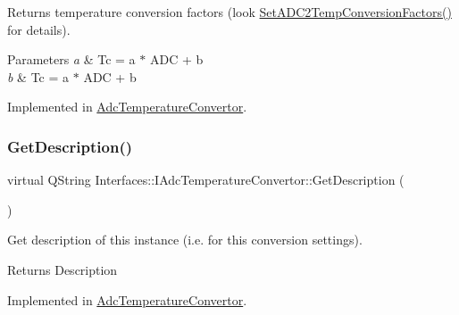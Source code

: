 Returns temperature conversion factors (look \hyperlink{class_interfaces_1_1_i_adc_temperature_convertor_a3e4c9204b3593bc434a041c7a69c430f}{Set\+A\+D\+C2\+Temp\+Conversion\+Factors()} for details). 


\begin{DoxyParams}{Parameters}
{\em a} & Tc = a $\ast$ A\+DC + b \\
\hline
{\em b} & Tc = a $\ast$ A\+DC + b \\
\hline
\end{DoxyParams}


Implemented in \hyperlink{class_adc_temperature_convertor_aeab56811467e8019731f1e2867a76671}{Adc\+Temperature\+Convertor}.

\mbox{\label{class_interfaces_1_1_i_adc_temperature_convertor_a2f3b59be793c3ed43e880ef12e9749bc}} 
\subsubsection{\texorpdfstring{Get\+Description()}{GetDescription()}}
{\footnotesize\ttfamily virtual Q\+String Interfaces\+::\+I\+Adc\+Temperature\+Convertor\+::\+Get\+Description (\begin{DoxyParamCaption}{ }\end{DoxyParamCaption})\hspace{0.3cm}{\ttfamily [pure virtual]}}



Get description of this instance (i.\+e. for this conversion settings). 

\begin{DoxyReturn}{Returns}
Description 
\end{DoxyReturn}


Implemented in \hyperlink{class_adc_temperature_convertor_ad82afdddbac46a95b6da44e769180d10}{Adc\+Temperature\+Convertor}.

\mbox{\label{class_interfaces_1_1_i_adc_temperature_convertor_a9697a0319f82ebd1fc20f5e24d3b191c}} 
